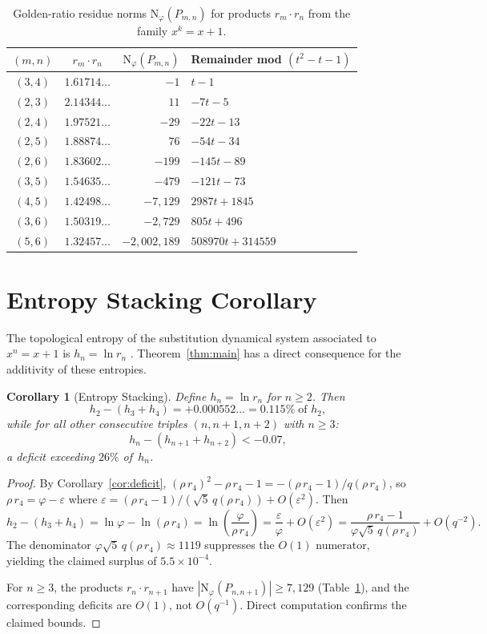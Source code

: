 \documentclass[12pt]{article}
\newtheorem{corollary}[theorem]{Corollary}
\newcommand{\N}{\mathrm{N}}
\begin{document}
\begin{table}[ht]
\centering
\caption{Golden-ratio residue norms $\N_\varphi(P_{m,n})$ for
  products $r_m \cdot r_n$ from the family $x^k = x + 1$.}
\label{tab:norms}
\medskip
\begin{tabular}{ccrl}
\toprule
$(m,n)$ & $r_m \cdot r_n$ & $\N_\varphi(P_{m,n})$ &
  Remainder mod $(t^2 - t - 1)$ \\
\midrule
$(3,4)$ & $1.61714\ldots$ & $-1$ & $t - 1$ \\
$(2,3)$ & $2.14344\ldots$ & $11$ & $-7t - 5$ \\
$(2,4)$ & $1.97521\ldots$ & $-29$ & $-22t - 13$ \\
$(2,5)$ & $1.88874\ldots$ & $76$ & $-54t - 34$ \\
$(2,6)$ & $1.83602\ldots$ & $-199$ & $-145t - 89$ \\
$(3,5)$ & $1.54635\ldots$ & $-479$ & $-121t - 73$ \\
$(4,5)$ & $1.42498\ldots$ & $-7{,}129$ & $2987t + 1845$ \\
$(3,6)$ & $1.50319\ldots$ & $-2{,}729$ & $805t + 496$ \\
$(5,6)$ & $1.32457\ldots$ & $-2{,}002{,}189$ & $508970t + 314559$ \\
\bottomrule
\end{tabular}
\end{table}


\section{Entropy Stacking Corollary}

The topological entropy of the substitution dynamical system
associated to $x^n = x + 1$ is $h_n = \ln r_n$ \cite{lind}.
Theorem~\ref{thm:main} has a direct consequence for the
additivity of these entropies.

\begin{corollary}[Entropy Stacking]\label{cor:entropy}
Define $h_n = \ln r_n$ for $n \geq 2$. Then
\[
  h_2 - (h_3 + h_4) = +0.000552\ldots = 0.115\%\; \text{of } h_2,
\]
while for all other consecutive triples $(n, n{+}1, n{+}2)$
with $n \geq 3$:
\[
  h_n - (h_{n+1} + h_{n+2}) < -0.07,
\]
a deficit exceeding $26\%$ of~$h_n$.
\end{corollary}

\begin{proof}
By Corollary~\ref{cor:deficit},
$(\rho\,r_4)^2 - \rho\,r_4 - 1 = -(\rho\,r_4 - 1)/q(\rho\,r_4)$,
so $\rho\,r_4 = \varphi - \varepsilon$ where
$\varepsilon = (\rho\,r_4 - 1)/(\sqrt{5}\,q(\rho\,r_4))
+ O(\varepsilon^2)$. Then
\[
  h_2 - (h_3 + h_4) = \ln\varphi - \ln(\rho\,r_4)
  = \ln\!\left(\frac{\varphi}{\rho\,r_4}\right)
  = \frac{\varepsilon}{\varphi} + O(\varepsilon^2)
  = \frac{\rho\,r_4 - 1}{\varphi\sqrt{5}\,q(\rho\,r_4)}
    + O(q^{-2}).
\]
The denominator $\varphi\sqrt{5}\,q(\rho\,r_4) \approx 1119$
suppresses the $O(1)$ numerator, yielding the claimed surplus
of $5.5 \times 10^{-4}$.

For $n \geq 3$, the products $r_n \cdot r_{n+1}$ have
$|\N_\varphi(P_{n,n+1})| \geq 7{,}129$ (Table~\ref{tab:norms}),
and the corresponding deficits are $O(1)$, not $O(q^{-1})$.
Direct computation confirms the claimed bounds.
\end{proof}
\end{document}
